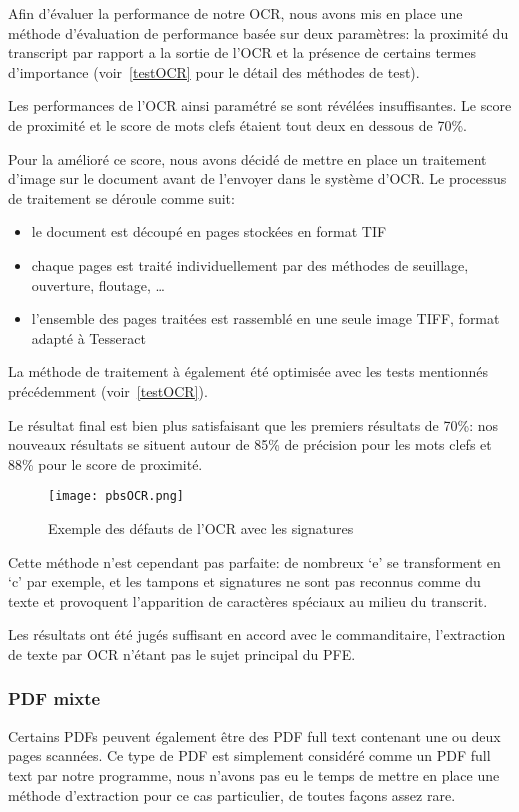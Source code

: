 Afin d'évaluer la performance de notre OCR, nous avons mis en place une méthode d'évaluation de performance basée sur deux paramètres: la proximité du transcript par rapport a la sortie de l'OCR et la présence de certains termes d'importance (voir~\ref{testOCR} pour le détail des méthodes de test).

Les performances de l'OCR ainsi paramétré se sont révélées insuffisantes.
Le score de proximité et le score de mots clefs étaient tout deux en dessous de 70\%.


Pour la amélioré ce score, nous avons décidé de mettre en place un traitement d'image sur le document avant de l'envoyer dans le système d'OCR\@.
Le processus de traitement se déroule comme suit:
\begin{itemize}
\item le document est découpé en pages stockées en format TIF
\item chaque pages est traité individuellement par des méthodes de seuillage, ouverture, floutage, \ldots
\item l'ensemble des pages traitées est rassemblé en une seule image TIFF, format adapté à Tesseract
\end{itemize}

La méthode de traitement à également été optimisée avec les tests mentionnés précédemment (voir~\ref{testOCR}).

Le résultat final est bien plus satisfaisant que les premiers résultats de 70\%: nos nouveaux résultats se situent autour de 85\% de précision pour les mots clefs et 88\% pour le score de proximité.

\begin{figure}[h!]
  \centering
  \texttt{[image: pbsOCR.png]}
	\caption[]{Exemple des défauts de l'OCR avec les signatures}
	\label{fig:defautsOCR}
\end{figure}

Cette méthode n'est cependant pas parfaite: de nombreux `e' se transforment en `c' par exemple, et les tampons et signatures ne sont pas reconnus comme du texte et provoquent l'apparition de caractères spéciaux au milieu du transcrit.

Les résultats ont été jugés suffisant en accord avec le commanditaire, l'extraction de texte par OCR n'étant pas le sujet principal du PFE\@.

\subsubsection{PDF mixte}
Certains PDFs peuvent également être des PDF full text contenant une ou deux pages scannées.
Ce type de PDF est simplement considéré comme un PDF full text par notre programme, nous n'avons pas eu le temps de mettre en place une méthode d'extraction pour ce cas particulier, de toutes façons assez rare.


